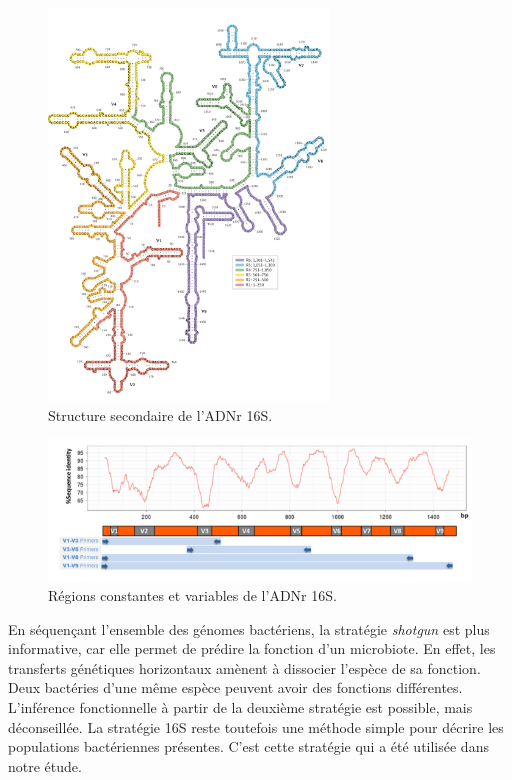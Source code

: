 \documentclass[12pt,a4paper]{article}
\begin{document}
\begin{figure}[ht]
\begin{center}
\includegraphics[scale=0.8]{img/ARN_16S.png}\hfill
\end{center}
\caption{Structure secondaire de l'ADNr 16S.}
\label{ARN16S}
\end{figure}

\begin{figure}[ht]
\begin{center}
\includegraphics[scale=0.8]{img/ARN16S_variation.png}\hfill
\end{center}
\caption{Régions constantes et variables de l'ADNr 16S.}
\label{ARN16SVariation}
\end{figure}

En séquençant l'ensemble des génomes bactériens, la stratégie \textit{shotgun} est plus informative, car elle permet de prédire la fonction d'un microbiote. En effet, les transferts génétiques horizontaux amènent à dissocier l'espèce de sa fonction. Deux bactéries d'une même espèce peuvent avoir des fonctions différentes. L'inférence fonctionnelle à partir de la deuxième stratégie est possible, mais déconseillée.
La stratégie 16S reste toutefois une méthode simple pour décrire les populations bactériennes présentes. C'est cette stratégie qui a été utilisée dans notre étude.
\end{document}
